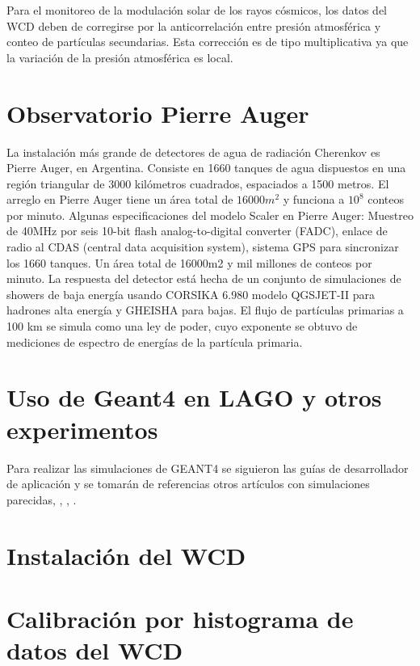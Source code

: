\documentclass{book}
\begin{document}
Para el monitoreo de la modulaci\'on solar de los rayos c\'osmicos, los datos del WCD deben de corregirse por la anticorrelaci\'on entre presi\'on atmosf\'erica y conteo de part\'iculas secundarias. Esta correcci\'on es de tipo multiplicativa ya que la variaci\'on de la presi\'on atmosf\'erica es local. \citep{Yunior} \citep{ASOREY}

\section{Observatorio Pierre Auger}

La instalaci\'on m\'as grande de detectores de agua de radiaci\'on Cherenkov es Pierre Auger, en Argentina. Consiste en 1660 tanques de agua dispuestos en una regi\'on triangular de 3000 kil\'ometros cuadrados, espaciados a 1500 metros. El arreglo en Pierre Auger tiene un \'area total de $16000m^{2}$ y funciona a $10^8$ conteos por minuto. Algunas especificaciones del modelo Scaler en Pierre Auger: Muestreo de 40MHz por seis 10-bit flash analog-to-digital converter (FADC), enlace de radio al CDAS (central data acquisition system), sistema GPS para sincronizar los 1660 tanques. Un \'area total de 16000m2 y mil millones de conteos por minuto. La respuesta del detector est\'a hecha de un conjunto de simulaciones de showers de baja energ\'ia usando CORSIKA 6.980 modelo QGSJET-II para hadrones alta energ\'ia y GHEISHA para bajas. El flujo de part\'iculas primarias a 100 km se simula como una ley de poder, cuyo exponente se obtuvo de mediciones de espectro de energ\'ias de la part\'icula primaria. \citep{VILLASENOR}

\section{Uso de Geant4 en LAGO y otros experimentos}

Para realizar las simulaciones de GEANT4 se siguieron las gu\'ias de desarrollador de aplicaci\'on y se tomar\'an de referencias otros art\'iculos con simulaciones parecidas, \citep{NIELSEN}, \citep{CHEN}, \citep{CALDERON}.



\section{Instalaci\'on del WCD}

\section{Calibraci\'on por histograma de datos del WCD}
\end{document}
